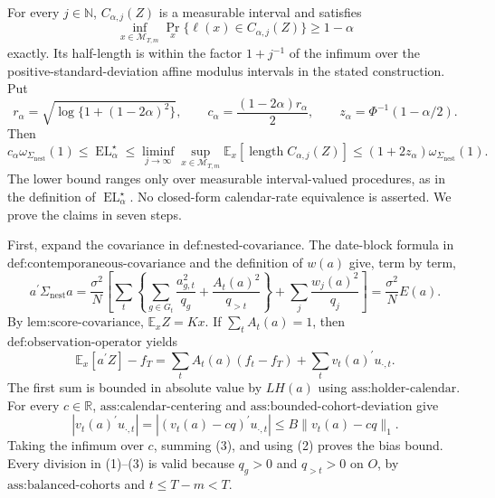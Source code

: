 For every \(j\in\mathbb N\), \(C_{\alpha,j}(Z)\) is a measurable interval and satisfies
\[
 \inf_{x\in\mathcal M_{T,m}}
 \Pr_x\{\ell(x)\in C_{\alpha,j}(Z)\}\ge1-\alpha
\]
exactly.  Its half-length is within the factor \(1+j^{-1}\) of the infimum over the positive-standard-deviation affine modulus intervals in the stated construction.  Put
\[
 r_\alpha=\sqrt{\log\{1+(1-2\alpha)^2\}},
 \qquad c_\alpha=\frac{(1-2\alpha)r_\alpha}{2},
 \qquad z_\alpha=\Phi^{-1}(1-\alpha/2).
\]
Then
\[
 c_\alpha\omega_{\Sigma_{\mathrm{nest}}}(1)
 \le\operatorname{EL}^{\star}_{\alpha}
 \le\liminf_{j\to\infty}\sup_{x\in\mathcal M_{T,m}}
 \mathbb E_x[\operatorname{length}C_{\alpha,j}(Z)]
 \le(1+2z_\alpha)\omega_{\Sigma_{\mathrm{nest}}}(1).
\]
The lower bound ranges only over measurable interval-valued procedures, as in the definition of \(\operatorname{EL}^{\star}_{\alpha}\).  No closed-form calendar-rate equivalence is asserted.
We prove the claims in seven steps.

First, expand the covariance in \(\text{def:nested-covariance}\).  The date-block formula in \(\text{def:contemporaneous-covariance}\) and the definition of \(w(a)\) give, term by term,
\[
 a^{\prime}\Sigma_{\mathrm{nest}}a
 =\frac{\sigma^2}{N}\left[
 \sum_t\left\{\sum_{g\in G_t}\frac{a_{g,t}^2}{q_g}
 +\frac{A_t(a)^2}{q_{>t}}\right\}
 +\sum_j\frac{w_j(a)^2}{q_j}\right]
 =\frac{\sigma^2}{N}E(a).                                      \tag{1}
\]
By \(\text{lem:score-covariance}\), \(\mathbb E_x Z=Kx\).  If \(\sum_tA_t(a)=1\), then \(\text{def:observation-operator}\) yields
\[
 \mathbb E_x[a^{\prime}Z]-f_T
 =\sum_tA_t(a)(f_t-f_T)+\sum_t v_t(a)^{\prime}u_{\cdot,t}.       \tag{2}
\]
The first sum is bounded in absolute value by \(LH(a)\) using \(\text{ass:holder-calendar}\).  For every \(c\in\mathbb R\), \(\text{ass:calendar-centering}\) and \(\text{ass:bounded-cohort-deviation}\) give
\[
 |v_t(a)^{\prime}u_{\cdot,t}|
 =|(v_t(a)-cq)^{\prime}u_{\cdot,t}|
 \le B\|v_t(a)-cq\|_1.                                         \tag{3}
\]
Taking the infimum over \(c\), summing (3), and using (2) proves the bias bound.  Every division in (1)--(3) is valid because \(q_g>0\) and \(q_{>t}>0\) on \(O\), by \(\text{ass:balanced-cohorts}\) and \(t\le T-m<T\).

